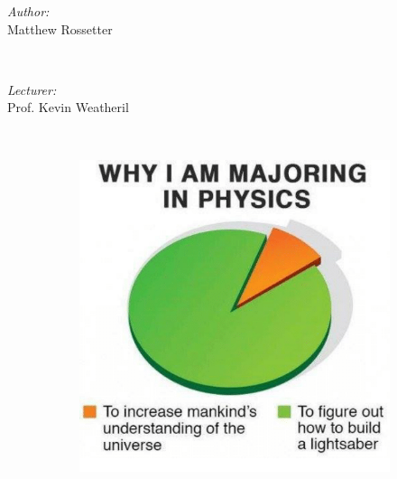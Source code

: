 \documentclass[a4paper, 11pt, normalem]{report}
\begin{document}
\begin{titlepage}
    \begin{minipage}{0.4\textwidth}
        \begin{flushleft} \large
            \emph{Author:} \\ Matthew Rossetter
        \end{flushleft}
    \end{minipage}~
    \begin{minipage}{0.4\textwidth}
        \begin{flushright} \large
            \emph{Lecturer:} \\ Prof. Kevin Weatheril 
        \end{flushright}
    \end{minipage}\\[2cm]
    \vfill
    \begin{figure}[H]
        \centering
        \begin{subfigure}[c]{0.55\textwidth}
            \includegraphics[width=\textwidth]{lightsaber.png}
        \end{subfigure}
        \begin{subfigure}[c]{0.42\textwidth}

\end{subfigure}
\end{figure}
\end{titlepage}
\end{document}
